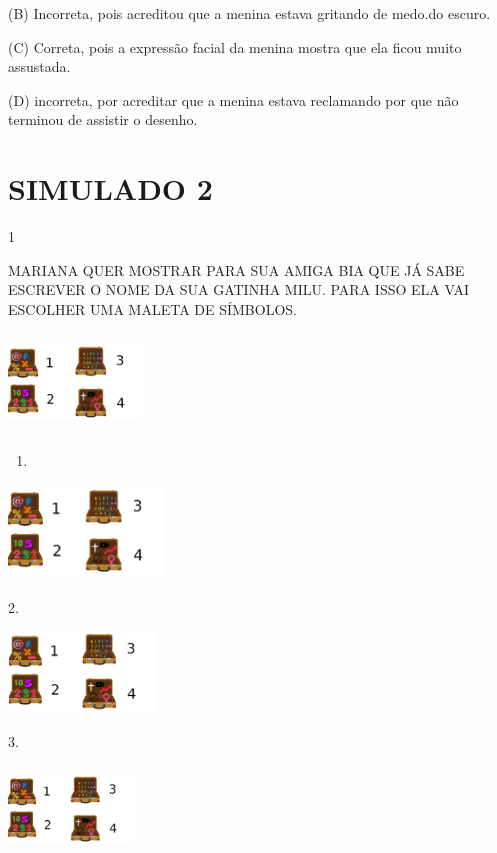 \begin{escola}
(B) Incorreta, pois acreditou que a menina estava gritando de medo.do
escuro.

(C) Correta, pois a expressão facial da menina mostra que ela ficou
muito assustada.

(D) incorreta, por acreditar que a menina estava reclamando por que não
terminou de assistir o desenho.

\chapter{SIMULADO 2}

\num{1}

MARIANA QUER MOSTRAR PARA SUA AMIGA BIA QUE JÁ SABE ESCREVER O NOME DA
SUA GATINHA MILU. PARA ISSO ELA VAI ESCOLHER UMA MALETA DE SÍMBOLOS.

\includegraphics[width=1.40208in,height=1.03194in]{media/image209.png}

\begin{enumerate}
\def\labelenumi{\arabic{enumi}.}
\item
\end{enumerate}

\includegraphics[width=1.62986in,height=0.98819in]{media/image209.png}

2.

\includegraphics[width=1.55139in,height=0.85000in]{media/image209.png}

3.

\includegraphics[width=1.31218in,height=0.92930in]{media/image209.png}


\end{escola}

